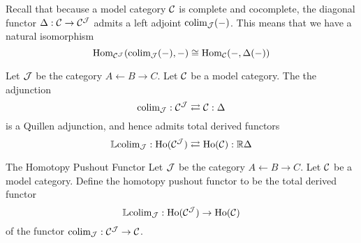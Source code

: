 \documentclass[a4paper]{article}
\begin{document}
Recall that because a model category $\mathcal{C}$ is complete and cocomplete, the diagonal functor $\Delta:\mathcal{C}\to\mathcal{C}^{\mathcal{J}}$ admits a left adjoint $\text{colim}_{\mathcal{J}}(-)$. This means that we have a natural isomorphism $$\operatorname{Hom}_{\mathcal{C}^{\mathcal{J}}}(\text{colim}_{\mathcal{J}}(-),-)\cong\operatorname{Hom}_{\mathcal{C}}(-,\Delta(-))$$

\begin{thm}{}{} Let $\mathcal{J}$ be the category $A\leftarrow B\rightarrow C$. Let $\mathcal{C}$ be a model category. The the adjunction $$\text{colim}_{\mathcal{J}}:\mathcal{C}^{\mathcal{J}}\rightleftarrows\mathcal{C}:\Delta$$ is a Quillen adjunction, and hence admits total derived functors $$\mathbb{L}\text{colim}_{\mathcal{J}}:\text{Ho}(\mathcal{C}^{\mathcal{J}})\rightleftarrows\text{Ho}(\mathcal{C}):\mathbb{R}\Delta$$
\end{thm}

\begin{defn}{The Homotopy Pushout Functor}{} Let $\mathcal{J}$ be the category $A\leftarrow B\rightarrow C$. Let $\mathcal{C}$ be a model category. Define the homotopy pushout functor to be the total derived functor $$\mathbb{L}\text{colim}_{\mathcal{J}}:\text{Ho}(\mathcal{C}^{\mathcal{J}})\to\text{Ho}(\mathcal{C})$$ of the functor $\text{colim}_{\mathcal{J}}:\mathcal{C}^{\mathcal{J}}\to\mathcal{C}$. 
\end{defn}
\end{document}
